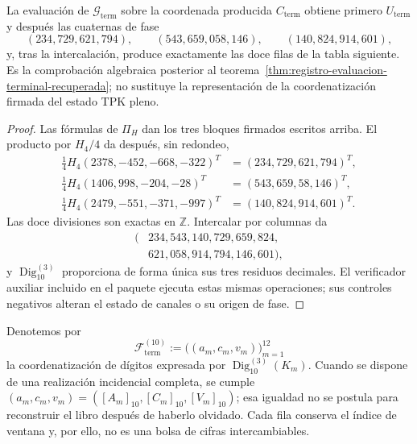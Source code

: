 \begin{proposition}
\label{prop:registro-generacion-modular-terminal}
La evaluación de \(\mathcal G_{\mathrm{term}}\) sobre la coordenada producida
\(C_{\mathrm{term}}\) obtiene primero \(U_{\mathrm{term}}\) y después las
cuaternas de fase
\[
 (234,729,621,794),\qquad(543,659,058,146),\qquad
 (140,824,914,601),
\]
y, tras la intercalación, produce exactamente las doce filas de la tabla
siguiente. Es la comprobación algebraica posterior al
teorema~\ref{thm:registro-evaluacion-terminal-recuperada}; no sustituye la
representación de la coordenatización firmada del estado TPK pleno.
\end{proposition}

\begin{proof}
Las fórmulas de \(\Pi_H\) dan los tres bloques firmados escritos arriba. El
producto por \(H_4/4\) da después, sin redondeo,
\begin{align*}
 \tfrac14H_4(2378,-452,-668,-322)^T&=(234,729,621,794)^T,\\
 \tfrac14H_4(1406,998,-204,-28)^T&=(543,659,58,146)^T,\\
 \tfrac14H_4(2479,-551,-371,-997)^T&=(140,824,914,601)^T.
\end{align*}
Las doce divisiones son exactas en \(\mathbb Z\). Intercalar por columnas da
\[
 \begin{split}
 (&234,543,140,729,659,824,\\
  &621,058,914,794,146,601),
 \end{split}
\]
y \(\operatorname{Dig}_{10}^{(3)}\) proporciona de forma única sus tres
residuos decimales. El verificador auxiliar incluido en el paquete ejecuta
estas mismas operaciones; sus controles negativos alteran el estado de canales
o su origen de fase.
\end{proof}

Denotemos por
\[
 \mathscr F_{\mathrm{term}}^{(10)}
 :=\bigl((a_m,c_m,v_m)\bigr)_{m=1}^{12}
\]
la coordenatización de dígitos expresada por \(\operatorname{Dig}_{10}^{(3)}(K_m)\).
Cuando se dispone de una realización incidencial completa, se cumple
\((a_m,c_m,v_m)=([A_m]_{10},[C_m]_{10},[V_m]_{10})\); esa igualdad no se
postula para reconstruir el libro después de haberlo olvidado. Cada fila
conserva el índice de ventana y, por ello, no es una bolsa de cifras
intercambiables.

